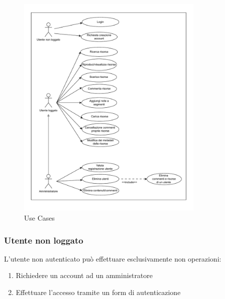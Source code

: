\documentclass[a4paper]{article}
\begin{document}
\begin{figure}[H]
    \centering
    \includegraphics[width=0.8\textwidth]{./figures/use_cases}
    \caption{Use Cases}
    \label{fig:use_cases}
\end{figure}
\newpage
\subsubsection{Utente non loggato}
L'utente non autenticato può effettuare esclusivamente non operazioni:
    \begin{enumerate}
        \item Richiedere un account ad un amministratore
        \item Effettuare l'accesso tramite un form di autenticazione
    \end{enumerate}
\end{document}
